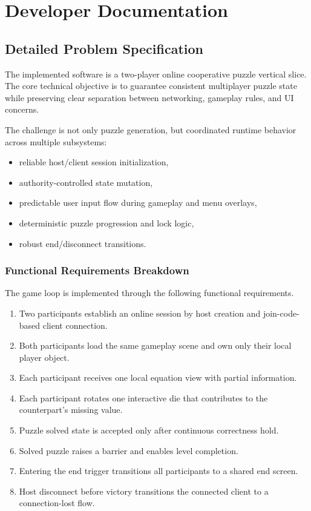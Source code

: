﻿\chapter{Developer Documentation}

\section{Detailed Problem Specification}
The implemented software is a two-player online cooperative puzzle vertical slice. The core technical objective is to guarantee consistent multiplayer puzzle state while preserving clear separation between networking, gameplay rules, and UI concerns.

The challenge is not only puzzle generation, but coordinated runtime behavior across multiple subsystems:
\begin{itemize}
\item reliable host/client session initialization,
\item authority-controlled state mutation,
\item predictable user input flow during gameplay and menu overlays,
\item deterministic puzzle progression and lock logic,
\item robust end/disconnect transitions.
\end{itemize}

\newpage

\subsection*{Functional Requirements Breakdown}
The game loop is implemented through the following functional requirements.
\begin{enumerate}
\item Two participants establish an online session by host creation and join-code-based client connection.
\item Both participants load the same gameplay scene and own only their local player object.
\item Each participant receives one local equation view with partial information.
\item Each participant rotates one interactive die that contributes to the counterpart's missing value.
\item Puzzle solved state is accepted only after continuous correctness hold.
\item Solved puzzle raises a barrier and enables level completion.
\item Entering the end trigger transitions all participants to a shared end screen.
\item Host disconnect before victory transitions the connected client to a connection-lost flow.
\end{enumerate}

